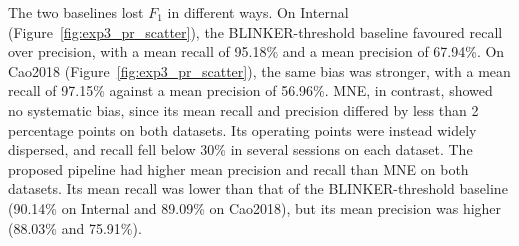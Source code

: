 The two baselines lost $F_1$ in different ways. On Internal (Figure~\ref{fig:exp3_pr_scatter}), the BLINKER-threshold baseline favoured recall over precision, with a mean recall of 95.18\% and a mean precision of 67.94\%. On Cao2018 (Figure~\ref{fig:exp3_pr_scatter}), the same bias was stronger, with a mean recall of 97.15\% against a mean precision of 56.96\%. MNE, in contrast, showed no systematic bias, since its mean recall and precision differed by less than 2 percentage points on both datasets. Its operating points were instead widely dispersed, and recall fell below 30\% in several sessions on each dataset. The proposed pipeline had higher mean precision and recall than MNE on both datasets. Its mean recall was lower than that of the BLINKER-threshold baseline (90.14\% on Internal and 89.09\% on Cao2018), but its mean precision was higher (88.03\% and 75.91\%).

